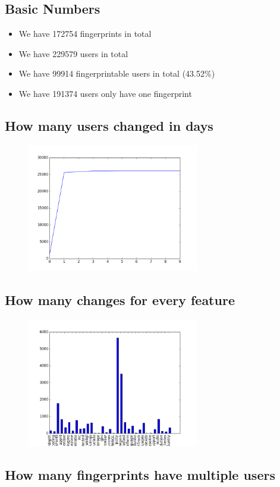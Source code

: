 \documentclass[10pt, conference, compsocconf]{IEEEtran}
\begin{document}
\subsection{Basic Numbers}
\begin{itemize}\item We have 172754 fingerprints in total\item We have 229579 users in total\item We have 99914 fingerprintable users in total (43.52\%)\item We have 191374 users only have one fingerprint \end{itemize}\subsection{How many users changed in days}
\begin{figure}[H]\centering\includegraphics[width=75mm,scale=0.5]{BasedonCookiechangebytime}\end{figure}\subsection{How many changes for every feature}
\begin{figure}[H]\centering\includegraphics[width=75mm,scale=0.5]{BasedonCookiefeaturechange}\end{figure}\subsection{How many fingerprints have multiple users}
\end{document}
